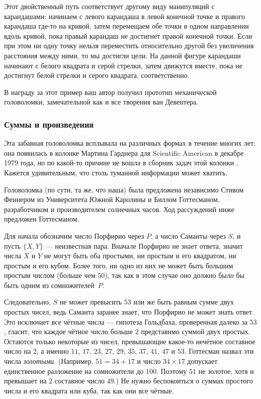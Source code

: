 Этот двойственный путь соответствует другому виду манипуляций с карандашами:
начинаем с левого карандаша в левой конечной точке и правого карандаша где-то на кривой,
затем перемещаем обе точки в одном направлении вдоль кривой, пока правый карандаш не достигнет правой конечной точки.
Если при этом ни одну точку нельзя переместить относительно другой без увеличения расстояния между ними, то мы достигли цели.
На данной фигуре карандаши начинают с белого квадрата и серой стрелки, затем движутся вместе, пока не достигнут белой стрелки и серого квадрата, соответственно.

\medskip

В награду за этот пример ваш автор получил прототип механической головоломки, замечательной как и все творения ван Девентера.

\subsubsection*{Суммы и произведения}

Эта забавная головоломка всплывала на различных формах в течение многих лет; она появилась в колонке Мартина Гарднера для Scientific American в декабре 1979 года, но по какой-то причине не вошла в сборник задач этой колонки \cite{29}.
Кажется удивительным, что столь туманной информации может хватить.

Головоломка (по сути, та же, что наша) была предложена независимо Стивом Феннером из Университета Южной Каролины и Биллом Готтесманом, разработчиком и производителем солнечных часов.
Ход рассуждений ниже предложен Готтесманом.

Для начала обозначим число Порфирио через $P$, а число Саманты через $S$, и пусть $\{X, Y\}$
--- неизвестная пара.
Вначале Порфирио не знает ответа, значит числа $X$ и $Y$ не могут быть оба простыми,
ни простым и его квадратом,
ни простым и его кубом.
Более того, ни одно из них не может быть большим простым числом (больше чем $50$), так как в этом случае оно должно было бы быть одним из сомножителей~$P$.

Следовательно, $S$ не может превысить $53$ или же быть равным сумме двух простых чисел,
ведь Саманта заранее знает, что Порфирио не может знать ответ.
Это исключает все чётные числа --- гипотеза Гольдбаха, проверенная далеко за $53$, гласит, что каждое чётное число больше $2$ представимо суммой двух простых.
Остаются только некоторые из чисел, превышающие какое-то нечётное составное число на $2$, а именно
$11$, $17$, $23$, $27$, $29$, $35$, $37$, $41$, $47$ и $53$.
Готтесман назвал эти числа \emph{золотыми}.
(Например, $51=34+17$ и число $34\times 17$ допускает единственное разложение на сомножители до $100$.
Поэтому $51$ не золотое, хотя и превышает на $2$ составное число $49$.)
Не нужно беспокоиться о суммах простого числа и его квадрата или куба, так как они все чётные.

